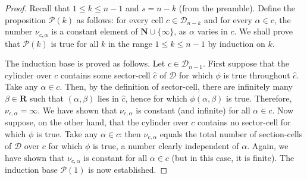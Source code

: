 \documentclass[10pt,a4paper]{amsart}
\def\N{\mathbf{ N}}
\def\R{\mathbf{ R}}
\begin{document}
\begin{proof}
    Recall that $1 \le k \le n-1$ and $s = n - k$ (from the preamble). 
    Define the proposition
    $\mathcal{P}(k)$ as follows: for every cell $c \in \mathcal{D}_{n-k}$
    and for every $\alpha \in c$, the number $\nu_{c, \alpha}$
    is a constant element of $\N \cup \{\infty\}$, as $\alpha$
    varies in $c$. We shall prove that $\mathcal{P}(k)$ is true for all
    $k$ in the range $1 \le k \le n-1$ by induction on $k$.

    The induction base is proved as follows.
    Let $c \in \mathcal{D}_{n-1}$. First suppose that the cylinder over $c$
    contains some sector-cell $\hat{c}$ of $\mathcal{D}$
    for which $\phi$ is true throughout $\hat{c}$.
    Take any $\alpha \in c$.
    Then, by the definition of sector-cell,
    there are infinitely many $\beta \in \R$ such that
    $(\alpha, \beta)$ lies in $\hat{c}$, hence for which
    $\phi(\alpha, \beta)$ is true.
    Therefore, $\nu_{c, \alpha} = \infty$.
    We have shown that $\nu_{c, \alpha}$ is constant (and infinite)
    for all $\alpha \in c$.
    Now suppose, on the other hand, that the cylinder over $c$
    contains no sector-cell for which $\phi$ is true.
    Take any $\alpha \in c$: then $\nu_{c, \alpha}$ equals the total number of section-cells
    of $\mathcal{D}$ over $c$ for which $\phi$ is true, a number clearly
    independent of $\alpha$. Again, we have shown that $\nu_{c, \alpha}$
    is constant for all $\alpha \in c$ (but in this case, it is finite).
    The induction base $\mathcal{P}(1)$ is now established.


\end{proof}
\end{document}
